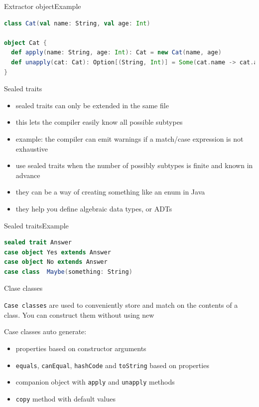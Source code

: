 \documentclass[aspectratio=169]{beamer}
\begin{document}
\begin{frame}[fragile]{Extractor object}{Example}
\begin{lstlisting}[style=scala,language=scala]
class Cat(val name: String, val age: Int)

object Cat {
  def apply(name: String, age: Int): Cat = new Cat(name, age)
  def unapply(cat: Cat): Option[(String, Int)] = Some(cat.name -> cat.age)
}
\end{lstlisting}
\end{frame}



\begin{frame}{Sealed traits}
\begin{itemize}
  \item sealed traits can only be extended in the same file
    \pause
  \item this lets the compiler easily know all possible subtypes
    \pause
  \item example: the compiler can emit warnings if a match/case expression is not exhaustive
    \pause
  \item use sealed traits when the number of possibly subtypes is finite and known in advance
    \pause
  \item they can be a way of creating something like an enum in Java
    \pause
  \item they help you define algebraic data types, or ADTs
\end{itemize}
\end{frame}

\begin{frame}[fragile]{Sealed traits}{Example}
\begin{lstlisting}[style=scala,language=scala]
sealed trait Answer
case object Yes extends Answer
case object No extends Answer
case class  Maybe(something: String)
\end{lstlisting}
\end{frame}

\begin{frame}{Clase classes}
\begin{block}{}
  \texttt{Case classes} are used to conveniently store and match on the contents of a class. You can
  construct them without using \alert{new}
\end{block}
    \pause
Case classes auto generate:
\pause
\begin{itemize}
  \item properties based on constructor arguments
    \pause
  \item \texttt{equals}, \texttt{canEqual}, \texttt{hashCode} and \texttt{toString} based on properties
    \pause
  \item companion object with \texttt{apply} and \texttt{unapply} methods
    \pause
  \item \texttt{copy} method with default values
\end{itemize}
\end{frame}
\end{document}
